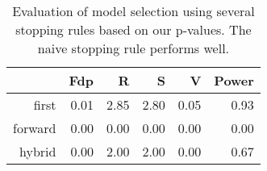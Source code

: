 \begin{table}[ht]
\centering
\begin{tabular}{rrrrrr}
  \hline
 & Fdp & R & S & V & Power \\ 
  \hline
first & 0.01 & 2.85 & 2.80 & 0.05 & 0.93 \\ 
  forward & 0.00 & 0.00 & 0.00 & 0.00 & 0.00 \\ 
  hybrid & 0.00 & 2.00 & 2.00 & 0.00 & 0.67 \\ 
   \hline
\end{tabular}
\caption{Evaluation of model selection using several stopping rules based on our p-values. The naive stopping rule performs well.} 
\end{table}

